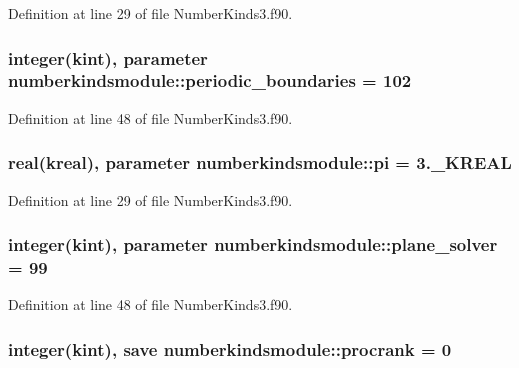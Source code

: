 Definition at line 29 of file Number\+Kinds3.\+f90.

\hypertarget{classnumberkindsmodule_a76e3561e9d937b2db78a7f1921229140}{
\subsubsection[{periodic\+\_\+boundaries}]{\setlength{\rightskip}{0pt plus 5cm}integer({\bf kint}), parameter numberkindsmodule\+::periodic\+\_\+boundaries = 102}}\label{classnumberkindsmodule_a76e3561e9d937b2db78a7f1921229140}


Definition at line 48 of file Number\+Kinds3.\+f90.

\hypertarget{classnumberkindsmodule_a5245bdece2ae8cdc7ed51106c7159d1e}{
\subsubsection[{pi}]{\setlength{\rightskip}{0pt plus 5cm}real({\bf kreal}), parameter numberkindsmodule\+::pi = 3.\+\_\+\+K\+R\+E\+A\+L}}\label{classnumberkindsmodule_a5245bdece2ae8cdc7ed51106c7159d1e}


Definition at line 29 of file Number\+Kinds3.\+f90.

\hypertarget{classnumberkindsmodule_ae767615e59f7444b7ff78296280c12b6}{
\subsubsection[{plane\+\_\+solver}]{\setlength{\rightskip}{0pt plus 5cm}integer({\bf kint}), parameter numberkindsmodule\+::plane\+\_\+solver = 99}}\label{classnumberkindsmodule_ae767615e59f7444b7ff78296280c12b6}


Definition at line 48 of file Number\+Kinds3.\+f90.

\hypertarget{classnumberkindsmodule_a7c6975d710b4d578d515c3d3312043fc}{
\subsubsection[{procrank}]{\setlength{\rightskip}{0pt plus 5cm}integer({\bf kint}), save numberkindsmodule\+::procrank = 0}}\label{classnumberkindsmodule_a7c6975d710b4d578d515c3d3312043fc}



